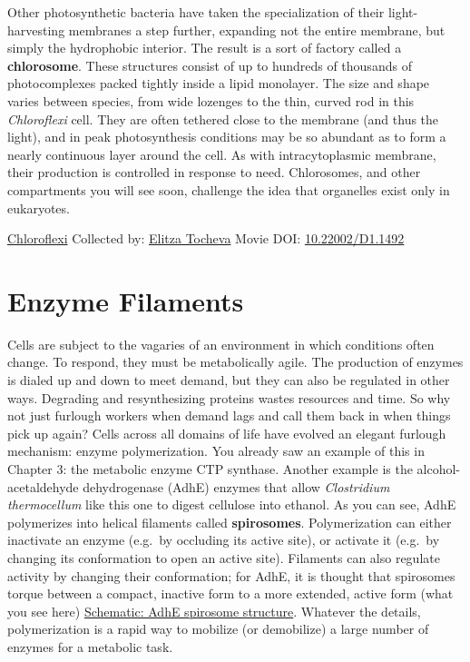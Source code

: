 \documentclass[]{tufte-book}
\begin{document}
Other photosynthetic bacteria have taken the specialization of their light-harvesting membranes a step further, expanding not the entire membrane, but simply the hydrophobic interior. The result is a sort of factory called a \textbf{chlorosome}. These structures consist of up to hundreds of thousands of photocomplexes packed tightly inside a lipid monolayer. The size and shape varies between species, from wide lozenges to the thin, curved rod in this \emph{Chloroflexi} cell. They are often tethered close to the membrane (and thus the light), and in peak photosynthesis conditions may be so abundant as to form a nearly continuous layer around the cell. As with intracytoplasmic membrane, their production is controlled in response to need. Chlorosomes, and other compartments you will see soon, challenge the idea that organelles exist only in eukaryotes.



\hypertarget{htmlwidget-960e92e793c1817ca08b}{}

\label{fig:4-4}\protect\hyperlink{tree}{Chloroflexi} Collected by: \protect\hyperlink{elitza_tocheva}{Elitza Tocheva} Movie DOI: \href{https://doi.org/10.22002/D1.1492}{10.22002/D1.1492}

\hypertarget{enzyme-filaments}{%
\section{Enzyme Filaments}\label{enzyme-filaments}}

Cells are subject to the vagaries of an environment in which conditions often change. To respond, they must be metabolically agile. The production of enzymes is dialed up and down to meet demand, but they can also be regulated in other ways. Degrading and resynthesizing proteins wastes resources and time. So why not just furlough workers when demand lags and call them back in when things pick up again? Cells across all domains of life have evolved an elegant furlough mechanism: enzyme polymerization. You already saw an example of this in Chapter 3: the metabolic enzyme CTP synthase. Another example is the alcohol-acetaldehyde dehydrogenase (AdhE) enzymes that allow \emph{Clostridium thermocellum} like this one to digest cellulose into ethanol. As you can see, AdhE polymerizes into helical filaments called \textbf{spirosomes}. Polymerization can either inactivate an enzyme (e.g.~by occluding its active site), or activate it (e.g.~by changing its conformation to open an active site). Filaments can also regulate activity by changing their conformation; for AdhE, it is thought that spirosomes torque between a compact, inactive form to a more extended, active form (what you see here) \protect\hyperlink{AdhE_spirosome_structure}{Schematic: AdhE spirosome structure}. Whatever the details, polymerization is a rapid way to mobilize (or demobilize) a large number of enzymes for a metabolic task.
\end{document}
